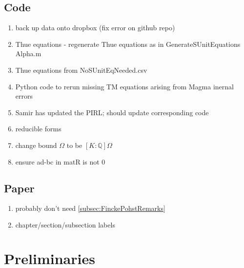 \documentclass[11pt]{report}
\theoremstyle{definition}
\begin{document}

\section{Code}
\label{sec:code}

\begin{enumerate}[\hspace{0.5cm}1.]
\item back up data onto dropbox (fix error on github repo)
\item Thue equations - regenerate Thue equations as in GenerateSUnitEquations Alpha.m
\item Thue equations from NoSUnitEqNeeded.csv
\item Python code to rerun missing TM equations arising from Magma inernal errors
\item Samir has updated the PIRL; should update corresponding code
\item reducible forms
\item change bound $\Omega$ to be $[K:\mathbb{Q}]\Omega$
\item ensure ad-bc in matR is not 0
\end{enumerate}


\section{Paper}
\label{sec:paper}

\begin{enumerate}[\hspace{0.5cm}1.]
\item probably don't need \autoref{subsec:FinckePohstRemarks}
\item chapter/section/subsection labels
\end{enumerate}


\chapter{Preliminaries}
\label{cha:preliminaries}
\end{document}
